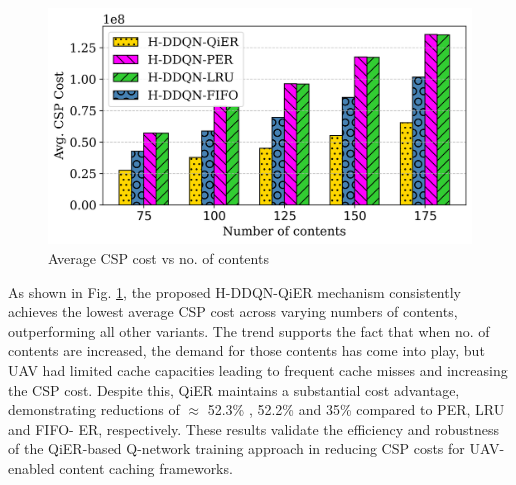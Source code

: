 \documentclass[journal]{IEEEtran}
\begin{document}

\begin{figure}[htbp]
    \centering
    \includegraphics[width=\linewidth]{MinMax Cost Scaled/avg_cost_vs_files_bar.png}  %
    \caption{Average CSP cost vs no. of contents}
    \label{fig:avg_cost_vs_files}
\end{figure}
As shown in Fig. \ref{fig:avg_cost_vs_files}, the proposed H-DDQN-QiER mechanism consistently achieves the lowest average CSP cost across varying numbers of contents, outperforming all other variants. The trend supports the fact that when no. of contents are increased, the demand for those contents has come into play, but UAV had limited cache capacities leading to frequent cache misses and increasing the CSP cost. Despite this, QiER maintains a substantial cost advantage, demonstrating reductions of $\approx$ 52.3\% , 52.2\% and 35\% compared to PER, LRU and FIFO- ER, respectively. These results validate the efficiency and robustness of the QiER-based Q-network training approach in reducing CSP costs for UAV-enabled content caching frameworks.
\end{document}
